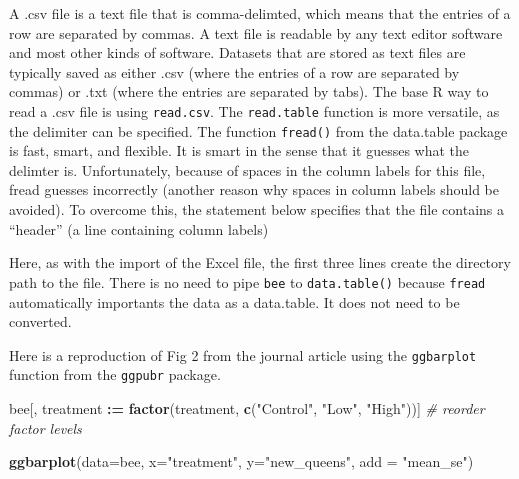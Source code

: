 \documentclass[]{book}
\newenvironment{Shaded}{\begin{snugshade}}{\end{snugshade}}
\newcommand{\CommentTok}[1]{\textcolor[rgb]{0.56,0.35,0.01}{\textit{#1}}}
\newcommand{\DataTypeTok}[1]{\textcolor[rgb]{0.13,0.29,0.53}{#1}}
\newcommand{\ErrorTok}[1]{\textcolor[rgb]{0.64,0.00,0.00}{\textbf{#1}}}
\newcommand{\KeywordTok}[1]{\textcolor[rgb]{0.13,0.29,0.53}{\textbf{#1}}}
\newcommand{\NormalTok}[1]{#1}
\newcommand{\OperatorTok}[1]{\textcolor[rgb]{0.81,0.36,0.00}{\textbf{#1}}}
\newcommand{\OtherTok}[1]{\textcolor[rgb]{0.56,0.35,0.01}{#1}}
\newcommand{\StringTok}[1]{\textcolor[rgb]{0.31,0.60,0.02}{#1}}
\begin{document}
A .csv file is a text file that is comma-delimted, which means that the entries of a row are separated by commas. A text file is readable by any text editor software and most other kinds of software. Datasets that are stored as text files are typically saved as either .csv (where the entries of a row are separated by commas) or .txt (where the entries are separated by tabs). The base R way to read a .csv file is using \texttt{read.csv}. The \texttt{read.table} function is more versatile, as the delimiter can be specified. The function \texttt{fread()} from the data.table package is fast, smart, and flexible. It is smart in the sense that it guesses what the delimter is. Unfortunately, because of spaces in the column labels for this file, fread guesses incorrectly (another reason why spaces in column labels should be avoided). To overcome this, the statement below specifies that the file contains a ``header'' (a line containing column labels)

\begin{Shaded}
\end{Shaded}

Here, as with the import of the Excel file, the first three lines create the directory path to the file. There is no need to pipe \texttt{bee} to \texttt{data.table()} because \texttt{fread} automatically importants the data as a data.table. It does not need to be converted.

Here is a reproduction of Fig 2 from the journal article using the \texttt{ggbarplot} function from the \texttt{ggpubr} package.

\begin{Shaded}
\begin{Highlighting}[]
\NormalTok{bee[, treatment }\OperatorTok{:}\ErrorTok{=}\StringTok{ }\KeywordTok{factor}\NormalTok{(treatment, }\KeywordTok{c}\NormalTok{(}\StringTok{"Control"}\NormalTok{, }\StringTok{"Low"}\NormalTok{, }\StringTok{"High"}\NormalTok{))] }\CommentTok{# reorder factor levels}

\KeywordTok{ggbarplot}\NormalTok{(}\DataTypeTok{data=}\NormalTok{bee,}
          \DataTypeTok{x=}\StringTok{"treatment"}\NormalTok{, }
          \DataTypeTok{y=}\StringTok{"new_queens"}\NormalTok{, }
          \DataTypeTok{add =} \StringTok{"mean_se"}\NormalTok{)}
\end{Highlighting}
\end{Shaded}
\end{document}
